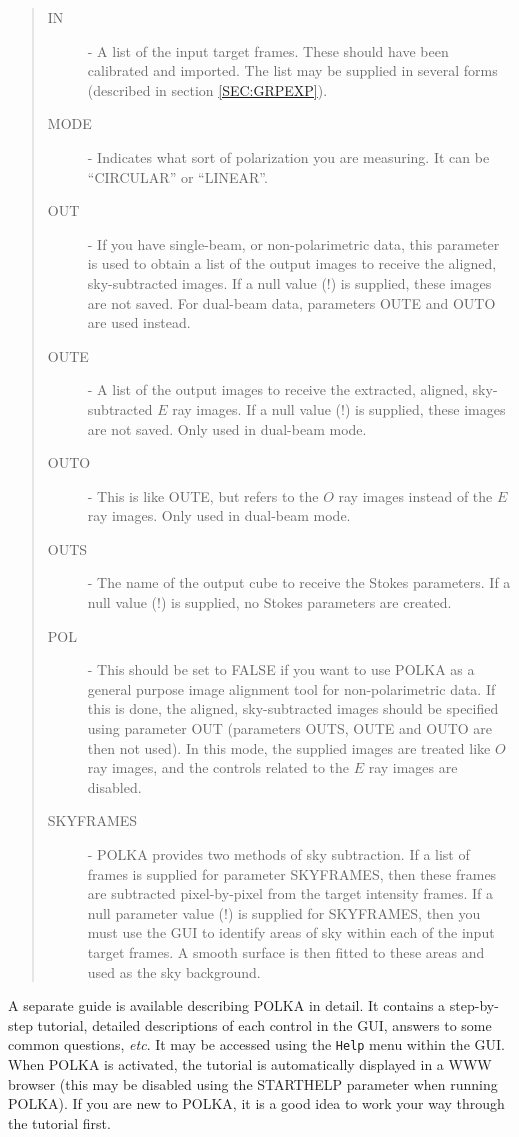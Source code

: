 \documentclass[twoside,11pt]{article}
\newcommand{\hyperref}[4]{#2\ref{#4}#3}
\renewcommand{\_}{\texttt{\symbol{95}}}
\begin{document}
\begin{quote}
\begin{description}
\item [IN]	- A list of the input target frames. These should have been
calibrated and imported. The list may be supplied in several forms
(described \hyperref{here}{in section }{}{SEC:GRPEXP}).
\item [MODE]	- Indicates what sort of polarization you are measuring. It 
can be ``CIRCULAR'' or ``LINEAR''.
\item [OUT]	- If you have single-beam, or non-polarimetric data, this
parameter is used to obtain a list of the output images to receive the 
aligned, sky-subtracted images. If a null value (!) is supplied, these 
images are not saved. For dual-beam data, parameters OUT\_E and OUT\_O
are used instead.
\item [OUT\_E]	- A list of the output images to receive the extracted,
aligned, sky-subtracted $E$ ray images. If a null value (!) is supplied, 
these images are not saved. Only used in dual-beam mode.
\item [OUT\_O]	- This is like OUT\_E, but refers to the $O$ ray images
instead of the $E$ ray images. Only used in dual-beam mode.
\item [OUT\_S]	- The name of the output cube to receive the Stokes
parameters. If a null value (!) is supplied, no Stokes parameters are
created.
\item [POL]	- This should be set to FALSE if you want to use POLKA as a
general purpose image alignment tool for non-polarimetric data. If this
is done, the aligned, sky-subtracted images should be specified using parameter
OUT (parameters OUT\_S, OUT\_E and OUT\_O are then not used). In this mode,
the supplied images are treated like $O$ ray images, and the controls
related to the $E$ ray images are disabled.
\item [SKYFRAMES] - POLKA provides two methods of sky subtraction. If a
list of frames is supplied for parameter SKYFRAMES, then these frames are
subtracted pixel-by-pixel from the target intensity frames. If a null
parameter value (!) is supplied for SKYFRAMES, then you must use the GUI to
identify areas of sky within each of the input target frames. A smooth
surface is then fitted to these areas and used as the sky background.

\end{description}
\end{quote}

A separate guide is available describing POLKA in detail. It 
contains a step-by-step tutorial, detailed descriptions of 
each control in the GUI, answers to some common questions, \emph{etc}. It may be
accessed using the \verb+Help+ menu within the GUI. When POLKA is
activated, the tutorial is automatically displayed in a WWW browser (this
may be disabled using the STARTHELP parameter when running POLKA). If you
are new to POLKA, it is  a good idea to work your way through the
tutorial first.
\end{document}
